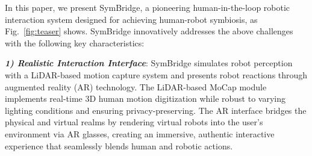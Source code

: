 In this paper, we present SymBridge, a pioneering human-in-the-loop robotic interaction system designed for achieving human-robot symbiosis, as Fig.~\ref{fig:teaser} shows. %
SymBridge innovatively addresses the above challenges with the following key characteristics: 

\noindent\textit{\textbf{1) Realistic Interaction Interface}}: SymBridge simulates robot perception with a LiDAR-based motion capture system and presents robot reactions through augmented reality (AR) technology. The LiDAR-based MoCap module implements real-time 3D human motion digitization while robust to varying lighting conditions and ensuring privacy-preserving. The AR interface bridges the physical and virtual realms by rendering virtual robots into the user’s environment via AR glasses, creating an immersive, authentic interactive experience that seamlessly blends human and robotic actions. %

